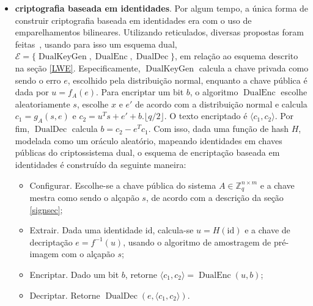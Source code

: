 \documentclass{SBCbookchapter}
\DeclareMathOperator{\DualKeyGen}{DualKeyGen}
\DeclareMathOperator{\DualEnc}{DualEnc}
\DeclareMathOperator{\DualDec}{DualDec}
\begin{document}
\begin{otherlanguage}{brazilian}
\begin{itemize}
\item \textbf{criptografia baseada em identidades}. Por algum tempo, a única forma de construir criptografia baseada em identidades era com o uso de emparelhamentos bilineares. 
Utilizando reticulados, diversas propostas foram feitas~\cite{ibe2,signtrap}, usando para isso um esquema dual, $\mathcal{E} = \{ \DualKeyGen, \DualEnc, \DualDec \}$, em relação ao esquema descrito na seção \ref{LWE}. Especificamente, $\DualKeyGen$ calcula a chave privada como sendo o erro $e$, escolhido pela distribuição normal, enquanto a chave pública é dada por $u = f_A(e)$. Para encriptar um bit $b$, o algoritmo $\DualEnc$ escolhe aleatoriamente $s$, escolhe $x$ e $e'$ de acordo com a distribuição normal e calcula $c_1 = g_A(s,e)$ e $c_2 = u^Ts + e' + b.\lfloor q/2\rfloor$. O texto encriptado é $\langle c_1, c_2 \rangle$. Por fim, $\DualDec$ calcula $b = c_2 - e^Tc_1$. Com isso, dada uma função de hash $H$, modelada como um oráculo aleatório, mapeando identidades em chaves públicas do criptossistema dual, o esquema de encriptação baseada em identidades é construído da seguinte maneira:

\begin{itemize}
\item \textsf{Configurar.} Escolhe-se a chave pública do sistema $A \in \mathbb{Z}^{n \times m}_q$ e a chave mestra como sendo o alçapão $s$, de acordo com a descrição da seção \ref{signsec};

\item \textsf{Extrair.} Dada uma identidade $\mathrm{id}$, calcula-se $u = H(\mathrm{id})$ e a chave de decriptação $e = f^{-1}(u)$, usando o algoritmo de amostragem de pré-imagem com o alçapão $s$;

\item \textsf{Encriptar.} Dado um bit $b$, retorne $\langle c_1, c_2 \rangle = \DualEnc(u,b)$;

\item \textsf{Decriptar.} Retorne $\DualDec(e, \langle c_1, c_2 \rangle)$. 
\end{itemize}



\end{itemize}
\end{otherlanguage}
\end{document}
